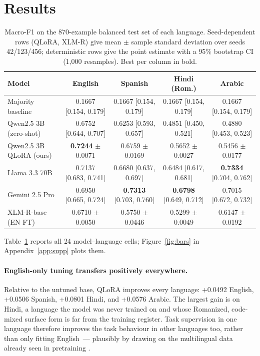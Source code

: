 \documentclass[11pt]{article}
\begin{document}
\section{Results}
\label{sec:results}

\begin{table}[t]
\centering\small
\setlength{\tabcolsep}{5pt}
\begin{tabular}{@{}lcccc@{}}
\toprule
Model & English & Spanish & Hindi (Rom.) & Arabic \\
\midrule
Majority baseline        & 0.1667 [0.154, 0.179] & 0.1667 [0.154, 0.179] & 0.1667 [0.154, 0.179] & 0.1667 [0.154, 0.179] \\
\addlinespace[2pt]
Qwen2.5 3B (zero-shot)   & 0.6752 [0.644, 0.707] & 0.6253 [0.593, 0.657] & 0.4851 [0.450, 0.521] & 0.4880 [0.453, 0.523] \\
Qwen2.5 3B QLoRA (ours)  & \textbf{0.7244} $\pm$ 0.0071 & 0.6759 $\pm$ 0.0169 & 0.5652 $\pm$ 0.0027 & 0.5456 $\pm$ 0.0177 \\
Llama 3.3 70B            & 0.7137 [0.683, 0.741] & 0.6680 [0.637, 0.697] & 0.6484 [0.617, 0.681] & \textbf{0.7334} [0.704, 0.762] \\
Gemini 2.5 Pro           & 0.6950 [0.665, 0.724] & \textbf{0.7313} [0.703, 0.760] & \textbf{0.6798} [0.649, 0.712] & 0.7015 [0.672, 0.732] \\
\mbox{XLM-R}-base (EN FT)       & 0.6710 $\pm$ 0.0050 & 0.5750 $\pm$ 0.0446 & 0.5299 $\pm$ 0.0049 & 0.6147 $\pm$ 0.0192 \\
\bottomrule
\end{tabular}
\caption{Macro-F1 on the 870-example balanced test set of each language.
Seed-dependent rows (QLoRA, \mbox{XLM-R}) give mean $\pm$ sample standard deviation
over seeds 42/123/456; deterministic rows give the point estimate with a 95\%
bootstrap CI (1{,}000 resamples). Best per column in bold.}
\label{tab:main}
\end{table}

Table~\ref{tab:main} reports all 24 model--language cells; Figure~\ref{fig:bars} in Appendix~\ref{app:supp} plots them.

\paragraph{English-only tuning transfers positively everywhere.}
Relative to the untuned base, QLoRA improves every language: \mbox{+0.0492}
English, \mbox{+0.0506} Spanish, \mbox{+0.0801} Hindi, and \mbox{+0.0576} Arabic.
The largest gain is on Hindi, a language the model was never trained on and whose
Romanized, code-mixed surface form is far from the training register. Task
supervision in one language therefore improves the task behaviour in other
languages too, rather than only fitting English~--- plausibly by drawing on the
multilingual data already seen in pretraining \citep{qwen2025modelcard}.
\end{document}
